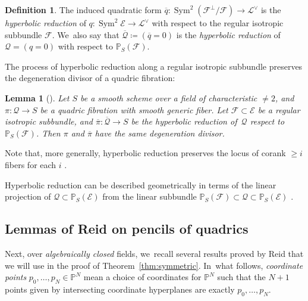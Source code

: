 \documentclass[JEP,XML,SOM,Unicode,NoEqCountersInSection,published]{cedram}
\let\cal\mathcal
\let\bb\mathbb\let\Bbb\mathbb
\theoremstyle{plain}
\newtheorem{lem}[thm]{Lemma}
\theoremstyle{definition}
\newtheorem{defn}[thm]{Definition}
\DeclareMathOperator{\Sym}{Sym}
\newcommand{\defi}[1]{\emph{#1}}
\renewcommand\P{\mathbb{P}}
\begin{document}
\begin{defn}
The induced quadratic form \(\overline{q}\colon\Sym^2(\cal F^\perp/\cal F)\to\cal L^{\vee}\) is the \defi{hyperbolic reduction} of \(q\colon\Sym^2 \cal E\to\cal L^\vee\) with respect to the regular isotropic subbundle \(\cal F\). We~also say that \(\overline{\cal Q}\coloneqq(\overline{q}=0)\) is the \defi{hyperbolic reduction} of \(\cal Q=(q=0)\) with respect to \(\bb P_S(\cal F)\).
\end{defn}

The process of hyperbolic reduction along a regular isotropic subbundle preserves the degeneration divisor of a quadric fibration:

\begin{lem}[{\cite[Cor.\,1.3.9]{ABB14}}]\label{lem:degeneration-divisor-preserved}
Let $S$ be a smooth scheme over a field of characteristic $\neq 2$, and $\pi\colon \mathcal{Q}\to S$ be a quadric fibration with smooth generic fiber.
Let $\cal F\subset \cal E$ be a regular isotropic subbundle, and $\overline{\pi}\colon \overline{\cal Q}\to S$ be the hyperbolic reduction of~$\mathcal{Q}$ respect to $\bb P_S(\cal F)$.
Then $\pi$ and $\overline{\pi}$ have the same degeneration divisor.
\end{lem}

Note that, more generally, hyperbolic reduction preserves the locus of corank \(\geq i\) fibers for each \(i\) \cite[Lem.\,2.4]{KuznetsovShinder18}.

Hyperbolic reduction can be described geometrically in terms of the linear projection of \(\cal Q\subset\bb P_S(\cal E)\) from the linear subbundle \(\bb P_S(\cal F)\subset\cal Q\subset\bb P_S(\cal E)\) \cite[Prop.\,2.5]{KuznetsovShinder18}.

\subsection{Lemmas of Reid on pencils of quadrics}

Next, over \emph{algebraically closed} fields, we~recall several results proved by Reid \cite{Reid-thesis} that we will use in the proof of Theorem~\ref{thm:symmetric}. In~what follows, \defi{coordinate points} $p_0,\dots, p_N\in \P^N$ mean a choice of coordinates for $\P^N$ such that the $N+1$ points given by intersecting coordinate hyperplanes are exactly $p_0,\dots, p_N$.
\end{document}
